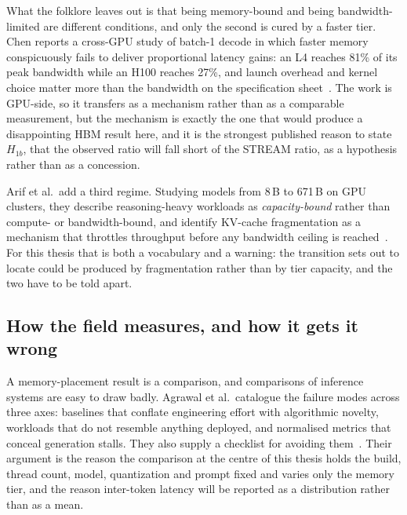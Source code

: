 What the folklore leaves out is that being memory-bound and being
bandwidth-limited are different conditions, and only the second is cured
by a faster tier.  Chen reports a cross-GPU study of batch-1 decode in
which faster memory conspicuously fails to deliver proportional latency
gains: an L4 reaches 81\% of its peak bandwidth while an H100 reaches
27\%, and launch overhead and kernel choice matter more than the
bandwidth on the specification sheet~\cite{chen2026memorybound}.  The
work is GPU-side, so it transfers as a mechanism rather than as a
comparable measurement, but the mechanism is exactly the one that would
produce a disappointing HBM result here, and it is the strongest
published reason to state \(H_{1b}\), that the observed ratio will fall
short of the STREAM ratio, as a hypothesis rather than as a concession.

Arif et al.\ add a third regime.  Studying models from 8\,B to 671\,B on
GPU clusters, they describe reasoning-heavy workloads as
\emph{capacity-bound} rather than compute- or bandwidth-bound, and
identify KV-cache fragmentation as a mechanism that throttles
throughput before any bandwidth ceiling is
reached~\cite{arif2026inferencescaling}.  For this thesis that is both a
vocabulary and a warning: the transition
 sets out to locate could be produced by
fragmentation rather than by tier capacity, and the two have to be told
apart.

\subsection{How the field measures, and how it gets it wrong}
\label{sec:lit-method}

A memory-placement result is a comparison, and comparisons of inference
systems are easy to draw badly.  Agrawal et al.\ catalogue the failure
modes across three axes: baselines that conflate engineering effort with
algorithmic novelty, workloads that do not resemble anything deployed,
and normalised metrics that conceal generation stalls.  They also supply
a checklist for avoiding them~\cite{agrawal2025evaluating}.
Their argument is the reason the comparison at the centre of this thesis
holds the build, thread count, model, quantization and prompt fixed and
varies only the memory tier, and the reason inter-token latency will be
reported as a distribution rather than as a mean.

